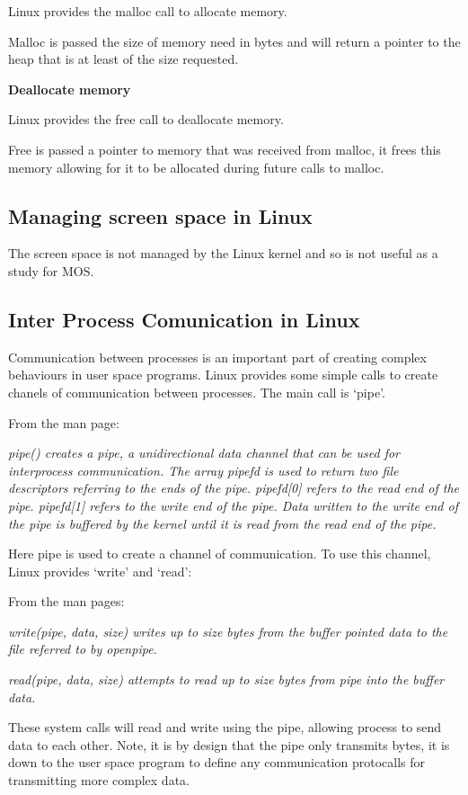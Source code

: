 \documentclass[a4paper]{report}
\begin{document}
Linux provides the malloc call to allocate memory.

Malloc is passed the size of memory need in bytes and will return a pointer to the heap that is at least of the size requested.

\noindent
\textbf{Deallocate memory}

Linux provides the free call to deallocate memory.

Free is passed a pointer to memory that was received from malloc, it frees this memory allowing for it to be allocated during future calls to malloc.


\subsection{Managing screen space in Linux}

The screen space is not managed by the Linux kernel and so is not useful as a study for MOS.

\subsection{Inter Process Comunication in Linux}

Communication between processes is an important part of creating complex behaviours in user space programs. Linux provides some simple calls to create chanels of communication between processes. The main call is `pipe'.

From the man page:

\textit{pipe() creates a pipe, a unidirectional data channel that can be used for interprocess communication. The array pipefd is used to return two file descriptors referring to the ends of the pipe. pipefd[0] refers to the read end of the pipe. pipefd[1] refers to the write end of the pipe. Data written to the write end of the pipe is buffered by the kernel until it is read from the read end of the pipe.} \cite{manPipe}

Here pipe is used to create a channel of communication. To use this channel, Linux provides `write' and `read':

From the man pages:

\textit{write(pipe, data, size) writes up to size bytes from the buffer pointed data to the file referred to by openpipe.} \cite{manWrite}

\textit{read(pipe, data, size) attempts to read up to size bytes from pipe into the buffer data.} \cite{manRead}

These system calls will read and write using the pipe, allowing process to send data to each other. Note, it is by design that the pipe only transmits bytes, it is down to the user space program to define any communication protocalls for transmitting more complex data.
\end{document}
